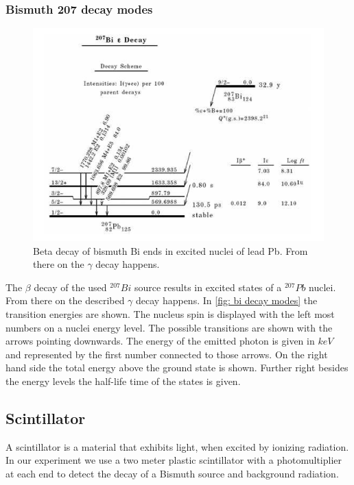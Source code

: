 \documentclass[]{article}
\begin{document}
\subsubsection{Bismuth 207 decay modes}

\begin{figure}[H]
\centering
\includegraphics[width=.9\textwidth]{Plots/Bi.png}
\caption{Beta decay of bismuth Bi ends in excited nuclei of lead Pb. From there on the $\gamma$ decay happens.}
\label{fig: bi decay modes}
\end{figure}

The $\beta$ decay of the used $^{207}Bi$ source results in excited states of a $^{207}Pb$ nuclei. From there on the described $\gamma$ decay happens. In \autoref{fig: bi decay modes} the transition energies are shown. The nucleus spin is displayed with the left most numbers on a nuclei energy level. The possible transitions are shown with the arrows pointing downwards. The energy of the emitted photon is given in $keV$ and represented by the first number connected to those arrows. On the right hand side the total energy above the ground state is shown. Further right besides the energy levels the half-life time of the states is given.


\subsection{Scintillator}\label{scintillator}
A scintillator is a material that exhibits light, when excited by ionizing radiation. In our experiment we use a two meter plastic scintillator with a photomultiplier at each end to detect the decay of a Bismuth source and background radiation.
\end{document}
